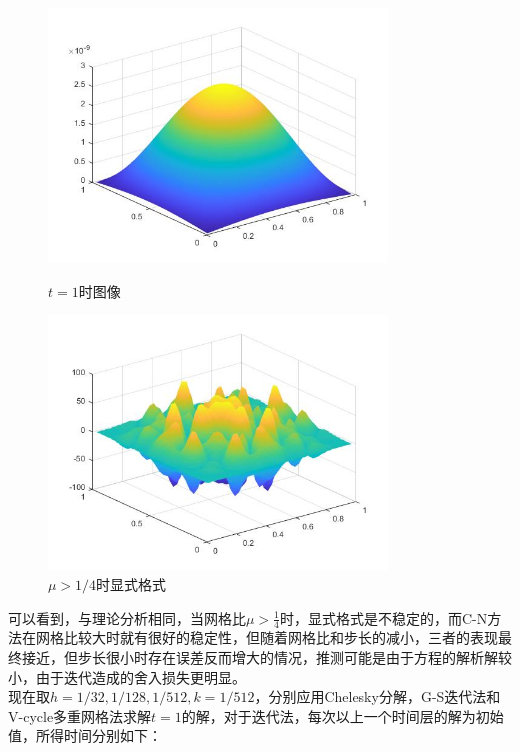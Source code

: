 \documentclass[12pt]{ctexart}
\begin{document}
\begin{figure}[H]
	\centering
	\begin{minipage}[t]{0.48\textwidth}
		\centering
		\includegraphics[width=9cm]{热扩散.jpg}
		\caption{$t=1$时图像}
	\end{minipage}
	\begin{minipage}[t]{0.48\textwidth}
		\centering
		\includegraphics[width=9cm]{显式不稳定.jpg}
		\caption{$\mu>1/4$时显式格式}
	\end{minipage}
\end{figure}

\noindent 可以看到，与理论分析相同，当网格比$\mu > \frac{1}{4}$时，显式格式是不稳定的，而C-N方法在网格比较大时就有很好的稳定性，但随着网格比和步长的减小，三者的表现最终接近，但步长很小时存在误差反而增大的情况，推测可能是由于方程的解析解较小，由于迭代造成的舍入损失更明显。\\
\indent 现在取$h = 1/32,1/128,1/512,k = 1/512$，分别应用Chelesky分解，G-S迭代法和V-cycle多重网格法求解$t=1$的解，对于迭代法，每次以上一个时间层的解为初始值，所得时间分别如下：\\
\end{document}
